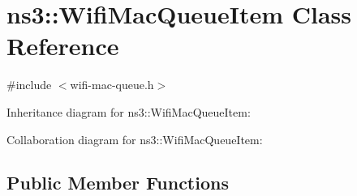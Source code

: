 \hypertarget{classns3_1_1WifiMacQueueItem}{}\section{ns3\+:\+:Wifi\+Mac\+Queue\+Item Class Reference}
\label{classns3_1_1WifiMacQueueItem}


{\ttfamily \#include $<$wifi-\/mac-\/queue.\+h$>$}



Inheritance diagram for ns3\+:\+:Wifi\+Mac\+Queue\+Item\+:


Collaboration diagram for ns3\+:\+:Wifi\+Mac\+Queue\+Item\+:
\subsection*{Public Member Functions}

